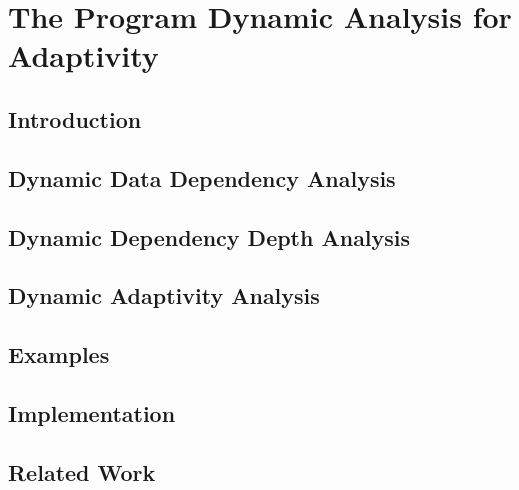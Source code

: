 \chapter{The Program Dynamic Analysis for Adaptivity}
\label{ch:adapt-dynamic}

\section{Introduction}
\label{sec:dynamic-intro}


\section{Dynamic Data Dependency Analysis}
\label{sec:dynamic-datadep}
%
\section{Dynamic Dependency Depth Analysis}
\label{sec:dynamic-reachability}
%
\section{Dynamic Adaptivity Analysis}
\label{sec:dynamic-dynamic}
%
\section{Examples}
\label{sec:dynamic-examples}

%
\section{Implementation}
\label{sec:dynamic-implementation}
%
\section{Related Work}
\label{sec:dynamic-relatedwork}
